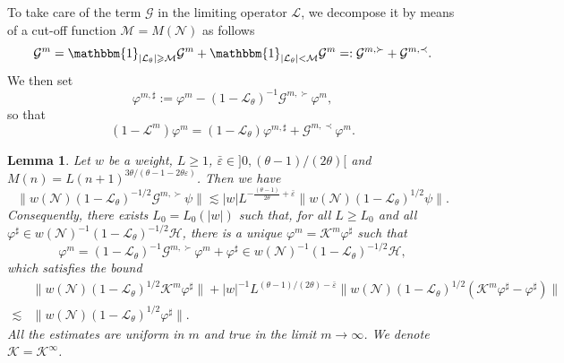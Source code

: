 \documentclass{article}
\newcommand{\assign}{:=}
\newcommand{\backassign}{=:}
\newtheorem{lemma}{Lemma}
\begin{document}
To take care of the term $\mathcal{G}$ in the limiting operator $\mathcal{L}$,
we decompose it by means of a cut-off function $\mathcal{M}= M (\mathcal{N})$
as follows
\[ \mathcal{G}^m = \mathbbm{1}_{| \mathcal{L}_{\theta} | \geqslant
   \mathcal{M}} \mathcal{G}^m + \mathbbm{1}_{| \mathcal{L}_{\theta} |
   <\mathcal{M}} \mathcal{G}^m \backassign \mathcal{G}^{m, \succ}
   +\mathcal{G}^{m, \prec} . \]
We then set
\begin{equation}
  \varphi^{m, \sharp} \assign \varphi^m - (1 -\mathcal{L}_{\theta})^{- 1}
  \mathcal{G}^{m, \succ} \varphi^m, \label{eq:phimsharp}
\end{equation}
so that
\begin{equation}
  (1 -\mathcal{L}^m) \varphi^m = (1 -\mathcal{L}_{\theta}) \varphi^{m, \sharp}
  +\mathcal{G}^{m, \prec} \varphi^m . \label{eq:act-Lm}
\end{equation}
\begin{lemma}
  \label{lem:exist-controlled}Let $w$ be a weight, $L \geqslant 1$,
  $\bar{\varepsilon} \in] 0, (\theta - 1) / (2 \theta) [$ and $M (n) = L (n +
  1)^{3 \theta / (\theta - 1 - 2 \theta \varepsilon)}$. Then we have
  \begin{equation}
    \| w (\mathcal{N}) (1 -\mathcal{L}_{\theta})^{- 1 / 2} \mathcal{G}^{m,
    \succ} \psi \| \lesssim | w | L^{- \frac{(\theta - 1)}{2 \theta} +
    \bar{\varepsilon}} \| w (\mathcal{N}) (1 -\mathcal{L}_{\theta})^{1 / 2}
    \psi \| . \label{eq:est-G-maj}
  \end{equation}
  Consequently, there exists $L_0 = L_0 (| w |)$ such that, for all $L
  \geqslant L_0$ and all $\varphi^{\sharp} \in w (\mathcal{N})^{- 1} (1
  -\mathcal{L}_{\theta})^{- 1 / 2} \mathcal{H}$, there is a unique $\varphi^m
  =\mathcal{K}^m \varphi^{\sharp}$ such that
  \[ \varphi^m = (1 -\mathcal{L}_{\theta})^{- 1} \mathcal{G}^{m, \succ}
     \varphi^m + \varphi^{\sharp} \in w (\mathcal{N})^{- 1} (1
     -\mathcal{L}_{\theta})^{- 1 / 2} \mathcal{H}, \]
  which satisfies the bound
  \begin{equation}
    \begin{array}{ll}
      & \| w (\mathcal{N}) (1 -\mathcal{L}_{\theta})^{1 / 2} \mathcal{K}^m
      \varphi^{\sharp} \| + | w |^{- 1} L^{(\theta - 1) / (2 \theta) -
      \bar{\varepsilon}} \| w (\mathcal{N}) (1 -\mathcal{L}_{\theta})^{1 / 2}
      (\mathcal{K}^m \varphi^{\sharp} - \varphi^{\sharp}) \|\\
      \lesssim & \| w (\mathcal{N}) (1 -\mathcal{L}_{\theta})^{1 / 2}
      \varphi^{\sharp} \| .
    \end{array} \label{eq:controlled-est}
  \end{equation}
  All the estimates are uniform in $m$ and true in the limit $m \rightarrow
  \infty$. We denote $\mathcal{K}=\mathcal{K}^{\infty}$.
\end{lemma}
\end{document}
